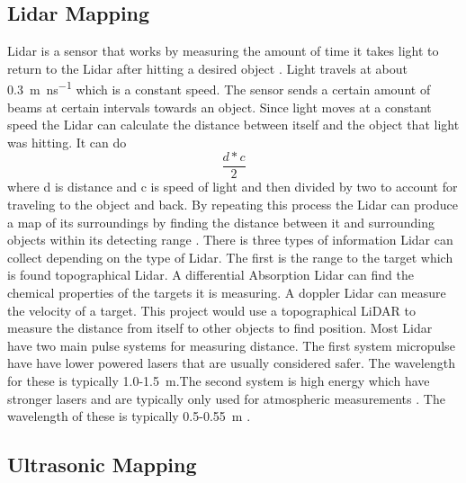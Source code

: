 \documentclass{article}
\begin{document}
  \subsection{Lidar Mapping}
	Lidar is a sensor that works by measuring the amount of time it takes light to return to the Lidar after hitting a desired object \cite{keith_lidar_2007}. Light travels at about \SI{0.3}{\meter\per\nano\second} which is a constant speed\cite{keith_lidar_2007}. The sensor sends a certain amount of beams at certain intervals towards an object. Since light moves at a constant speed the Lidar can calculate the distance between itself and the object that light was hitting. It can do
    $$\frac{d*c}{2}$$
   where d is distance and c is speed of light and then divided by two to account for traveling to the object and back. By repeating this process the Lidar can produce a map of its surroundings by finding the distance between it and surrounding objects within its detecting range \cite{keith_lidar_2007}.
	There is three types of information Lidar can collect depending on the type of Lidar. The first is the range to the target which is found topographical Lidar\cite{keith_lidar_2007}. A differential Absorption Lidar can find the chemical properties of the targets it is measuring. A doppler Lidar can measure the velocity of a target\cite{keith_lidar_2007}. This project would use a topographical LiDAR to measure the distance from itself to other objects to find position.
  Most Lidar have two main pulse systems for measuring distance. The first system micropulse have have lower powered lasers that are usually considered safer\cite{keith_lidar_2007}. The wavelength for these is typically 1.0-\SI{1.5}{\meter}\cite{lidar_uk_how_2017}.The second system is high energy which have stronger lasers and are typically only used for atmospheric measurements \cite{keith_lidar_2007}. The wavelength of these is typically 0.5-\SI{0.55}{\meter} \cite{lidar_uk_how_2017}.

  \subsection{Ultrasonic Mapping}
\end{document}
